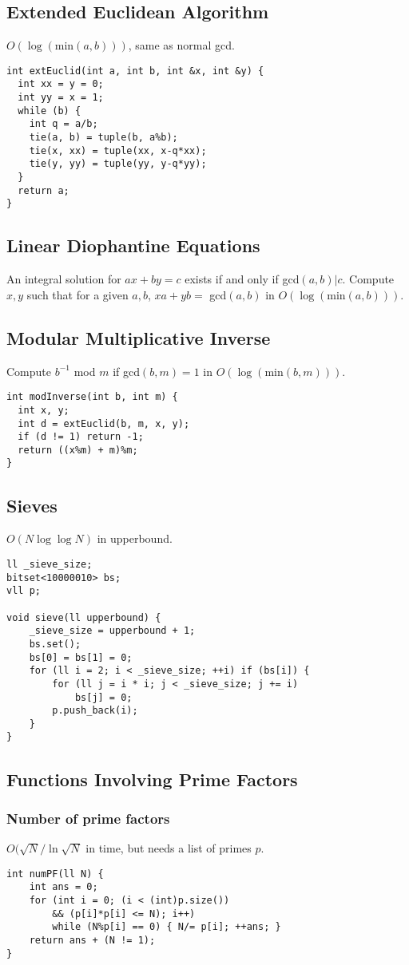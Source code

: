 \documentclass[10pt]{article}{\twocolumn}
\begin{document}
\subsection{Extended Euclidean Algorithm}
$O(\log{(\text{min}(a,b))})$, same as normal gcd.
\begin{lstlisting}
int extEuclid(int a, int b, int &x, int &y) {    
  int xx = y = 0;
  int yy = x = 1;
  while (b) {                                    
    int q = a/b;
    tie(a, b) = tuple(b, a%b);
    tie(x, xx) = tuple(xx, x-q*xx);
    tie(y, yy) = tuple(yy, y-q*yy);
  }
  return a;                                     
}
\end{lstlisting}
\subsection{Linear Diophantine Equations}
An integral solution for $ax + by = c$ exists if and only if gcd$(a,b) | c$.
Compute $x, y$ such that for a given $a,b$, $xa + yb =$ gcd$(a,b)$ in $O(\log{(\text{min}(a,b))})$. 

\subsection{Modular Multiplicative Inverse}
Compute $b^{-1}$ mod $m$ if gcd$(b,m) = 1$ in $O(\log(\text{min}(b,m)))$.
\begin{lstlisting}
int modInverse(int b, int m) {                   
  int x, y;
  int d = extEuclid(b, m, x, y);                
  if (d != 1) return -1;                        
  return ((x%m) + m)%m;
}
\end{lstlisting}
\subsection{Sieves}
$O(N\log{\log{N}})$ in upperbound.
\begin{lstlisting}
ll _sieve_size;
bitset<10000010> bs;
vll p;

void sieve(ll upperbound) {
    _sieve_size = upperbound + 1;
    bs.set();
    bs[0] = bs[1] = 0;
    for (ll i = 2; i < _sieve_size; ++i) if (bs[i]) {
        for (ll j = i * i; j < _sieve_size; j += i) 
            bs[j] = 0;
        p.push_back(i);
    }
}
\end{lstlisting}
\subsection{Functions Involving Prime Factors}
\subsubsection{Number of prime factors}
$O(\sqrt{N}/\ln\sqrt{N}$ in time, but needs a list of primes $p$. 
\begin{lstlisting}
int numPF(ll N) {
    int ans = 0;
    for (int i = 0; (i < (int)p.size()) 
        && (p[i]*p[i] <= N); i++)
        while (N%p[i] == 0) { N/= p[i]; ++ans; }
    return ans + (N != 1);
}
\end{lstlisting}
\end{document}

